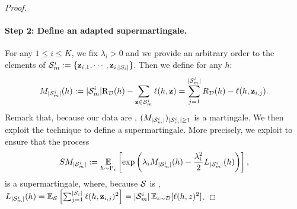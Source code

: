 \begin{noaddcontents}
\begin{proof}
    \paragraph{Step 2: Define an adapted supermartingale. }
        For any $1\leq i \leq K$, we fix $\lambda_i>0$ and we provide an arbitrary order to the elements of $\Sm^{i}\defeq \{\z_{i,1},\cdots,\z_{i,|S_i|}\}$. Then we define for any $h$: 
        \begin{align*}
        M_{|\Sm^{i}|}(h)\defeq   |\Sm^{i}|\Risk_{\D}(h) - \sum_{\z\in\Sm^{i}} \loss(h, \z) = \sum_{j=1}^{|\Sm^{i}|} R_\D(h) - \loss(h,\z_{i,j}).
        \end{align*}
        Remark that, because our data are \iid, $(M_{|\Sm^{i}|})_{|\Sm^{i}|\geq 1}$ is a martingale. 
        We then exploit the technique \cite{chugg2023unified} to define a supermartingale. 
        More precisely, we exploit \cite[][Lemma A.2 and Lemma B.1]{chugg2023unified} to ensure that the process
        \begin{align*}
        SM_{|\Sm^{i}|} \defeq \EE_{h\sim \P_i} \LB\exp\left(\lambda_i M_{|\Sm^{i}|}(h) - \frac{\lambda_i^2}{2} L_{|\Sm^{i}|}(h) \right)\RB,
        \end{align*}
        is a supermartingale, where, because $\S$ is \iid,  $L_{|\Sm^{i}|}(h) = \EE_{\S} \LB \sum_{j=1}^{|S_i|}\loss(h,\z_{i,j})^2 \RB = |\Sm^{i}| \EE_{z\sim \D}[\loss(h,z)^2]$. 
    

\end{proof}
\end{noaddcontents}

